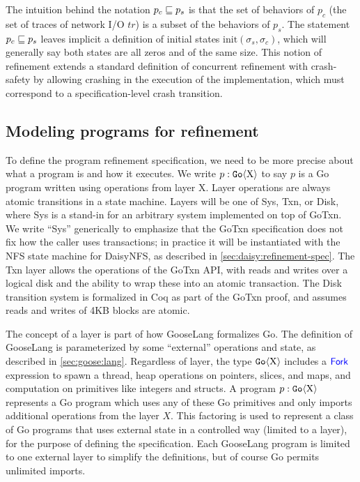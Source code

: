 The intuition behind the notation $p_{c} \sqsubseteq p_{s}$ is that the set of
behaviors of $p_{c}$ (the set of traces of network I/O $\textit{tr}$) is a subset of the
behaviors of $p_{s}$. The statement $p_{c} \sqsubseteq p_{s}$ leaves implicit
a definition of initial states $\mathrm{init}(\sigma_{s}, \sigma_{c})$, which
will generally say both states are all zeros and of the same size. This notion
of refinement extends a standard definition of concurrent refinement with
crash-safety by allowing crashing in the execution of the implementation, which
must correspond to a specification-level crash transition.

\subsection{Modeling programs for refinement}%
\label{sec:txn:go-layers}

To define the program refinement specification, we need to be more precise about what a program is
and how it executes. We
write $p : \mathtt{Go}\langle \mathrm{X} \rangle$ to say $p$ is a Go program written using operations
from layer X.
Layer operations are always atomic transitions in a state machine. Layers will
be one of Sys, Txn, or Disk, where Sys is a
stand-in for an arbitrary system implemented on top of GoTxn. We write
``Sys'' generically to emphasize that the GoTxn specification does not fix how the
caller uses transactions; in practice it will be instantiated with the NFS state
machine for DaisyNFS, as described in \cref{sec:daisy:refinement-spec}.
The Txn layer allows the operations of the GoTxn API, with reads and writes over a logical
disk and the ability to wrap these into an atomic transaction. The
Disk transition system is formalized in Coq as part of the GoTxn proof,
and assumes reads and writes of 4KB blocks are atomic.

The concept of a layer is part of how GooseLang formalizes Go. The definition of
GooseLang is parameterized by some ``external'' operations and state, as
described in \cref{sec:goose:lang}. Regardless of layer, the type
$\mathtt{Go}\langle \mathrm{X} \rangle$ includes a $\mathsf{\textcolor{blue}{Fork}}$ expression to spawn a thread, heap operations
on pointers, slices, and maps, and computation on primitives like integers and
structs. A program $p : \mathtt{Go}\langle \mathrm{X} \rangle$ represents a Go program which uses any
of these Go primitives and only imports additional operations from the layer
$X$. This factoring is used to represent a class of Go programs that uses
external state in a controlled way (limited to a layer), for the purpose of
defining the specification. Each GooseLang program is limited to one external
layer to simplify the definitions, but of course Go permits unlimited imports.

